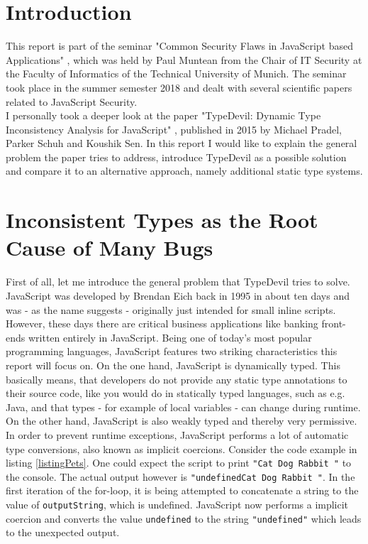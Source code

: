 \documentclass[runningheads,a4paper]{llncs}
\begin{document}
\newpage

\section{Introduction}

This report is part of the seminar "Common Security Flaws in JavaScript based Applications" \cite{CommonSecFlaws}, which was held by Paul Muntean from the Chair of IT Security at the Faculty of Informatics of the Technical University of Munich.
The seminar took place in the summer semester 2018 and dealt with several scientific papers related to JavaScript Security. \\
I personally took a deeper look at the paper "TypeDevil: Dynamic Type Inconsistency Analysis for JavaScript" \cite{DBLP:conf/icse/PradelSS15}, published in 2015 by Michael Pradel, Parker Schuh and Koushik Sen.
In this report I would like to explain the general problem the paper tries to address, introduce TypeDevil as a possible solution and compare it to an alternative approach, namely additional static type systems. 

\section{Inconsistent Types as the Root Cause of Many Bugs}
First of all, let me introduce the general problem that TypeDevil tries to solve. \\
JavaScript was developed by Brendan Eich back in 1995 in about ten days and was - as the name suggests - originally just intended for small inline scripts.
However, these days there are critical business applications like banking front-ends written entirely in JavaScript. 
Being one of today's most popular programming languages, JavaScript features two striking characteristics this report will focus on. 
On the one hand, JavaScript is dynamically typed. 
This basically means, that developers do not provide any static type annotations to their source code, like you would do in statically typed languages, such as e.g. Java, and that types - for example of local variables - can change during runtime.
On the other hand, JavaScript is also weakly typed and thereby very permissive. In order to prevent runtime exceptions, JavaScript performs a lot of automatic type conversions, also known as implicit coercions.
Consider the code example in listing \ref{listingPets}. 
One could expect the script to print \lstinline[columns=fixed]{"Cat Dog Rabbit "} to the console.
The actual output however is \lstinline[columns=fixed]{"undefinedCat Dog Rabbit "}. 
In the first iteration of the for-loop, it is being attempted to concatenate a string to the value of \lstinline[columns=fixed]{outputString}, which is undefined. 
JavaScript now performs a implicit coercion and converts the value \lstinline[columns=fixed]{undefined} to the string \lstinline[columns=fixed]{"undefined"} which leads to the unexpected output.
\end{document}

